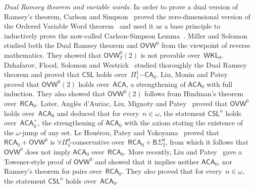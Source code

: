 \documentclass{article}
\numberwithin{theorem}{section}
\newcommand{\PIOOCA}{\Pi^1_1\mathsf{-CA}}
\newcommand{\RCA}{\mathsf{RCA}}
\newcommand{\WKL}{\mathsf{WKL}}
\newcommand{\ACA}{\mathsf{ACA}}
\newcommand{\OVW}{\mathsf{OVW}}
\newcommand{\CSL}{\mathsf{CSL}}
\newcommand{\BSig}{\mathsf{B}\Sigma^0}
\begin{document}
\textit{Dual Ramsey theorem and variable words.} In order to prove a dual version of Ramsey's theorem, Carlson and Simpson~\cite{carlson1984dual} proved the zero-dimensional version of the Ordered Variable Word theorem~\cite[Theorem 6.3]{carlson1984dual} and used it as a base principle to inductively prove the now-called Carlson-Simpson Lemma~\cite[Lemma 2.4]{carlson1984dual}. Miller and Solomon~\cite{miller2004effectiveness} studied both the Dual Ramsey theorem and $\OVW^0$ from the viewpoint of reverse mathematics. They showed that $\OVW^0_2(2)$ is not provable over~$\WKL_0$. Dzhafarov, Flood, Solomon and Westrick~\cite{Dzhafarov2017Effectiveness} studied thoroughly the Dual Ramsey theorem and proved that $\CSL$ holds over~$\PIOOCA_0$. Liu, Monin and Patey~\cite{liu2019computable} proved that $\OVW^0(2)$ holds over~$\ACA$, a strengthening of $\ACA_0$ with full induction. They also showed that $\OVW^0(2)$ follows from Hindman's theorem over~$\RCA_0$. Later, Anglès d'Auriac, Liu, Mignoty and Patey~\cite{angles2023carlson} proved that $\OVW^0$ holds over~$\ACA_0$ and deduced that for every~$n \in \omega$, the statement $\CSL^n$ holds over~$\ACA_0^+$, the strengthening of $\ACA_0$ with the axiom stating the existence of the $\omega$-jump of any set. Le Houérou, Patey and Yokoyama~\cite{houerou2024pi} proved that $\RCA_0 + \OVW^0$ is $\forall \Pi^0_4$-conservative over~$\RCA_0 + \BSig_2$, from which it follows that $\OVW^0$ does not imply $\ACA_0$ over~$\RCA_0$. More recently, Liu and Patey~\cite{liu2026reverse} gave a Towsner-style proof of $\OVW^0$ and showed that it implies neither $\ACA_0$, nor Ramsey's theorem for pairs over~$\RCA_0$. They also proved that for every~$n \in \omega$, the statement $\CSL^n$ holds over~$\ACA_0$.
\end{document}
